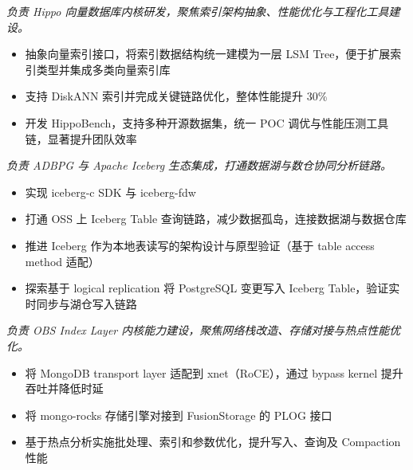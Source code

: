 \documentclass{resume}
\begin{document}
\textit{负责 Hippo 向量数据库内核研发，聚焦索引架构抽象、性能优化与工程化工具建设。}
\begin{onehalfspacing}
\begin{itemize}
  \item 抽象向量索引接口，将索引数据结构统一建模为一层 LSM Tree，便于扩展索引类型并集成多类向量索引库
  \item 支持 DiskANN 索引并完成关键链路优化，整体性能提升 30\%
  \item 开发 HippoBench，支持多种开源数据集，统一 POC 调优与性能压测工具链，显著提升团队效率
\end{itemize}
\end{onehalfspacing}

\textit{负责 ADBPG 与 Apache Iceberg 生态集成，打通数据湖与数仓协同分析链路。}
\begin{onehalfspacing}
\begin{itemize}
  \item 实现 iceberg-c SDK 与 iceberg-fdw
  \item 打通 OSS 上 Iceberg Table 查询链路，减少数据孤岛，连接数据湖与数据仓库
  \item 推进 Iceberg 作为本地表读写的架构设计与原型验证（基于 table access method 适配）
  \item 探索基于 logical replication 将 PostgreSQL 变更写入 Iceberg Table，验证实时同步与湖仓写入链路
\end{itemize}
\end{onehalfspacing}

\textit{负责 OBS Index Layer 内核能力建设，聚焦网络栈改造、存储对接与热点性能优化。}
\begin{onehalfspacing}
\begin{itemize}
  \item 将 MongoDB transport layer 适配到 xnet（RoCE），通过 bypass kernel 提升吞吐并降低时延
  \item 将 mongo-rocks 存储引擎对接到 FusionStorage 的 PLOG 接口
  \item 基于热点分析实施批处理、索引和参数优化，提升写入、查询及 Compaction 性能
\end{itemize}
\end{onehalfspacing}
\end{document}
